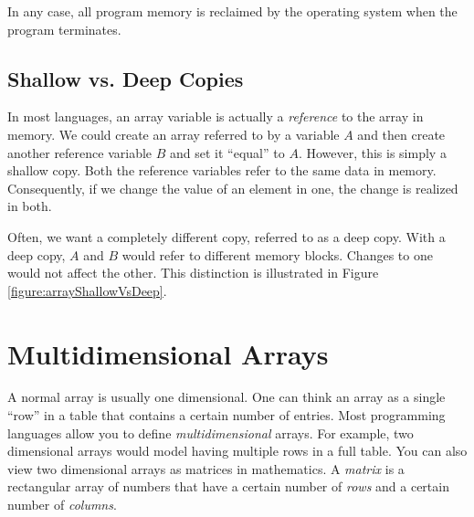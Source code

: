 In any case, all program memory is reclaimed by 
the operating system when the program terminates.

\subsection{Shallow vs. Deep Copies}
\label{subsection:shallowVsDeep}

In most languages, an array variable is actually a \emph{reference}
to the array in memory.  We could create an array referred to 
by a variable $A$ and then create another reference variable
$B$ and set it ``equal'' to $A$.  However, this is simply a 
\gls{shallow copy}.  Both the reference variables refer to the
same data in memory.  Consequently, if we change the
value of an element in one, the change is realized in both.

Often, we want a completely different copy, referred to as a
\gls{deep copy}.  With a deep copy, $A$ and $B$ would 
refer to different memory blocks.  Changes to one would not
affect the other.  This distinction is illustrated in Figure
\ref{figure:arrayShallowVsDeep}.




\section{Multidimensional Arrays}

A normal array is usually one dimensional.  One can think an array
as a single ``row'' in a table that contains a certain number of entries.
Most programming languages allow you to define \emph{multidimensional}
arrays.  For example, two dimensional arrays would model having
multiple rows in a full table.  You can also view two dimensional 
arrays as matrices in mathematics.  A \emph{matrix} is a rectangular
array of numbers that have a certain number of \emph{rows} and
a certain number of \emph{columns}.  


